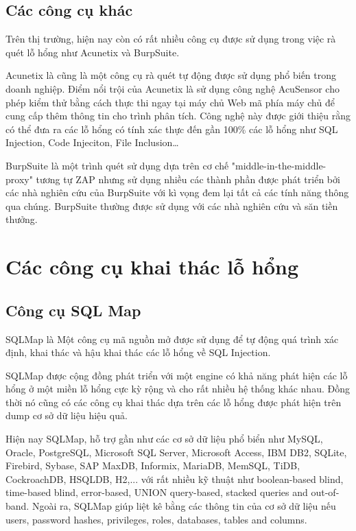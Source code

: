 \documentclass[./../main.tex]{subfiles}
\begin{document}
\subsection{Các công cụ khác}

Trên thị trường, hiện nay còn có rất nhiều công cụ được sử dụng trong việc
rà quét lỗ hổng như Acunetix và BurpSuite.

Acunetix là cũng là một công cụ rà quét tự động được sử dụng phổ biến trong
doanh nghiệp. Điểm nổi trội của Acunetix là sử dụng công nghệ AcuSensor cho
phép kiểm thử bằng cách thực thi ngay tại máy chủ Web mã phía máy chủ để cung
cấp thêm thông tin cho trình phân tích. Công nghệ này được giới thiệu rằng có
thể đưa ra các lỗ hổng có tính xác thực đến gần 100\% các lỗ hổng như SQL Injection,
Code Injeciton, File Inclusion\ldots

BurpSuite là một trình quét sử dụng dựa trên cơ chế "middle-in-the-middle-proxy"
tương tự ZAP nhưng sử dụng nhiều các thành phần được phát triển bởi
các nhà nghiên cứu của BurpSuite với kì vọng đem lại tất cả các tính năng
thông qua chúng. BurpSuite thường được sử dụng với các nhà nghiên cứu và săn
tiền thưởng.

\section{Các công cụ khai thác lỗ hổng}

\subsection{Công cụ SQL Map}
SQLMap là Một công cụ mã nguồn mở được sử dụng để tự động quá trình xác
định, khai thác và hậu khai thác các lỗ hổng về SQL Injection.

SQLMap được cộng đồng phát triển với một engine có khả năng phát hiện các
lỗ hổng ở một miền lỗ hổng cực kỳ rộng và cho rất nhiều hệ thống khác nhau.
Đồng thời nó cũng có các công cụ khai thác dựa trên các lỗ hổng được phát
hiện trên dump cơ sở dữ liệu hiệu quả.

Hiện nay SQLMap, hỗ trợ gần như các cơ sở dữ liệu phổ biển như MySQL,
Oracle, PostgreSQL, Microsoft SQL Server, Microsoft Access, IBM DB2,
SQLite, Firebird, Sybase, SAP MaxDB, Informix, MariaDB, MemSQL, TiDB,
CockroachDB, HSQLDB, H2,... với rất nhiều kỹ thuật như boolean-based blind,
time-based blind, error-based, UNION query-based, stacked queries and
out-of-band. Ngoài ra, SQLMap giúp liệt kê bằng các thông tin của cơ
sở dữ liệu nếu users, password hashes, privileges, roles, databases,
tables and columns.
\end{document}
